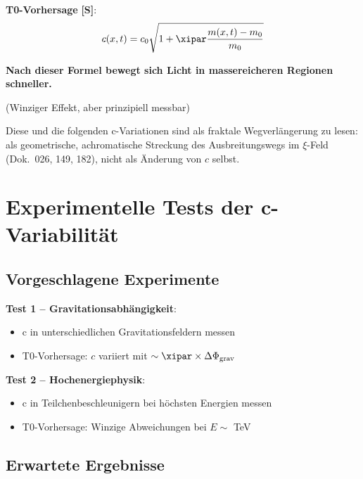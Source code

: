 	\textbf{T0-Vorhersage} \textbf{[S]}: 
	\begin{equation}
		c(x,t) = c_0 \sqrt{1 + \xipar \frac{m(x,t) - m_0}{m_0}}
	\end{equation}
	
	\textbf{Nach dieser Formel bewegt sich Licht in massereicheren Regionen schneller.}
	
	(Winziger Effekt, aber prinzipiell messbar)
	
	Diese und die folgenden c-Variationen sind als fraktale Wegverlängerung zu lesen: als geometrische, achromatische Streckung des Ausbreitungswegs im $\xi$-Feld (Dok.~026, 149, 182), nicht als Änderung von $c$ selbst.
	
	\section{Experimentelle Tests der c-Variabilität}
	
	\subsection{Vorgeschlagene Experimente}
	
	\textbf{Test 1 – Gravitationsabhängigkeit}:
	\begin{itemize}
		\item c in unterschiedlichen Gravitationsfeldern messen
		\item T0-Vorhersage: $c$ variiert mit $\sim \xipar \times \Delta\Phi_{\text{grav}}$
	\end{itemize}

	\textbf{Test 2 – Hochenergiephysik}:
	\begin{itemize}
		\item c in Teilchenbeschleunigern bei höchsten Energien messen
		\item T0-Vorhersage: Winzige Abweichungen bei $E \sim$ TeV
	\end{itemize}
	
	\subsection{Erwartete Ergebnisse}
	
	\begin{table}[htbp]
		\centering
		\caption{Vorhergesagte c-Variationen}
	\end{table}
	
